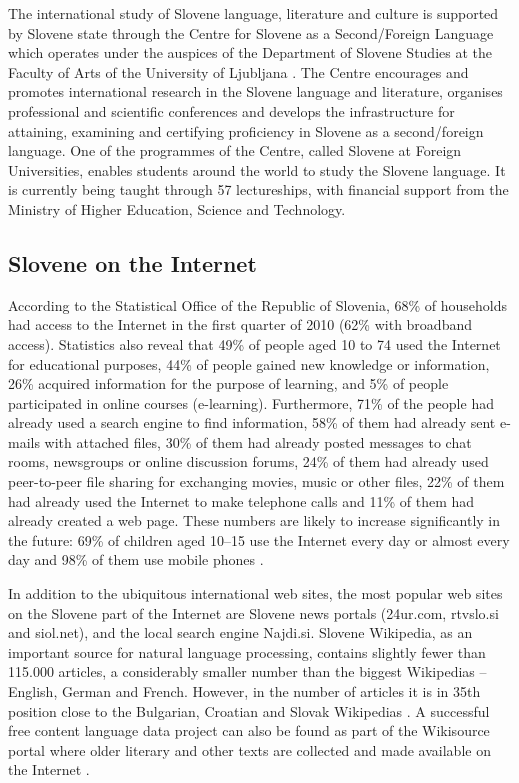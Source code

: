 \begin{multicols}{2}
The international study of Slovene language, literature and culture is supported by Slovene state through the Centre for Slovene as a Second/Foreign Language which operates under the auspices of the Department of Slovene Studies at the Faculty of Arts of the University of Ljubljana \cite{CSDTJ1}.  The Centre encourages and promotes international research in the Slovene language and literature, organises professional and scientific conferences and develops the infrastructure for attaining, examining and certifying proficiency in Slovene as a second/foreign language. One of the programmes of the Centre, called Slovene at Foreign Universities, enables students around the world to study the Slovene language. It is currently being taught through 57 lectureships, with financial support from the Ministry of Higher Education, Science and Technology.

\subsection{Slovene on the Internet}

According to the Statistical Office of the Republic of Slovenia, 68\% of households had access to the Internet in the first quarter of 2010 (62\% with broadband access). Statistics also reveal that 49\% of people aged 10 to 74 used the Internet for educational purposes, 44\% of people gained new knowledge or information, 26\% acquired information for the purpose of learning, and 5\% of people participated in online courses (e-learning). Furthermore, 71\% of the people had already used a search engine to find information, 58\% of them had already sent e-mails with attached files, 30\% of them had already posted messages to chat rooms, newsgroups or online discussion forums, 24\% of them had already used peer-to-peer file sharing for exchanging movies, music or other files, 22\% of them had already used the Internet to make telephone calls and 11\% of them had already created a web page. These numbers are likely to increase significantly in the future: 69\% of children aged 10--15 use the Internet every day or almost every day and 98\% of them use mobile phones  \cite{SURS3}. 


In addition to the ubiquitous international web sites, the most popular web sites on the Slovene part of the Internet are Slovene news portals (24ur.com, rtvslo.si and siol.net), and the local search engine Najdi.si. Slovene Wikipedia, as an important source for natural language processing, contains slightly fewer than 115.000 articles, a considerably smaller number than the biggest Wikipedias – English, German and French. However, in the number of articles it is in 35th position close to the Bulgarian, Croatian and Slovak Wikipedias \cite{Wiki1}.  A successful free content language data project can also be found as part of the Wikisource portal where older literary and other texts are collected and made available on the Internet \cite{Wiki2}.  


\end{multicols}
